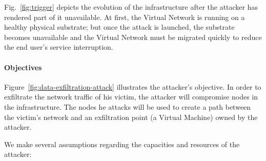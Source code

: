 \label{sec:attack_model}

Fig.~\ref{fig:trigger} depicts the evolution of the infrastructure after the attacker has rendered part of it unavailable. 
At first, the Virtual Network is running on a healthy physical substrate; but once the attack is launched, the substrate becomes unavailable and the Virtual Network must be migrated quickly to reduce the end user's service interruption.

\paragraph{Objectives}
Figure~\ref{fig:data-exfiltration-attack} illustrates the attacker's objective.
In order to exfiltrate the network traffic of his victim, the attacker will compromise nodes in the infrastructure. The nodes he attacks will be used to create a path between the victim's network and an exfiltration point (\eg a Virtual Machine) owned by the attacker.

We make several assumptions regarding the capacities and resources of the attacker:
